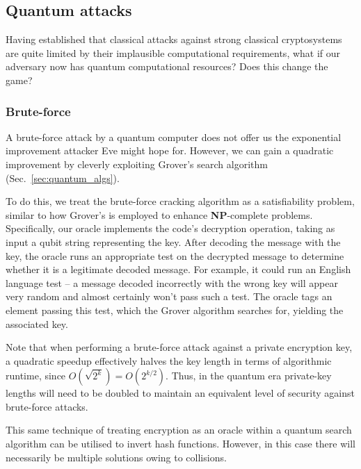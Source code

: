 %
%

\subsection{Quantum attacks}

Having established that classical attacks against strong classical cryptosystems are quite limited by their implausible computational requirements, what if our adversary now has quantum computational resources? Does this change the game?

%
%

\subsubsection{Brute-force}\label{sec:brute_force_attacks}

A brute-force attack by a quantum computer does not offer us the exponential improvement attacker Eve might hope for. However, we can gain a quadratic improvement by cleverly exploiting Grover's search algorithm (Sec.~\ref{sec:quantum_algs}).

To do this, we treat the brute-force cracking algorithm as a satisfiability problem, similar to how Grover's is employed to enhance \textbf{NP}-complete problems. Specifically, our oracle implements the code's decryption operation, taking as input a qubit string representing the key. After decoding the message with the key, the oracle runs an appropriate test on the decrypted message to determine whether it is a legitimate decoded message. For example, it could run an English language test -- a message decoded incorrectly with the wrong key will appear very random and almost certainly won't pass such a test. The oracle tags an element passing this test, which the Grover algorithm searches for, yielding the associated key.

Note that when performing a brute-force attack against a private encryption key, a quadratic speedup effectively halves the key length in terms of algorithmic runtime, since \mbox{$O(\sqrt{2^k}) = O(2^{k/2})$}. Thus, in the quantum era private-key lengths will need to be doubled to maintain an equivalent level of security against brute-force attacks.

This same technique of treating encryption as an oracle within a quantum search algorithm can be utilised to invert hash functions. However, in this case there will necessarily be multiple solutions owing to collisions.

